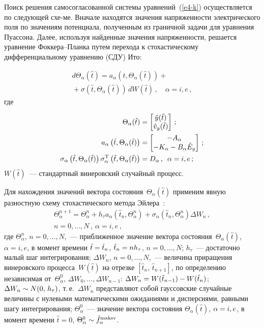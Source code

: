 \begin{multicols}{2}
Поиск решения самосогласованной системы уравнений~(\ref{e4-k}) осуществляется по следующей 
схе-\linebreak ме. Вначале находятся значения напряженности\linebreak
 электрического поля по значениям потенциала, 
полученным из граничной задачи для уравнения Пуассона. Далее, используя найденные значения 
напряженности, решается уравнение Фок\-ке\-ра--План\-ка путем перехода к стохастическому 
дифференциальному уравнению (СДУ) Ито:

\noindent
\begin{multline*}
d\Theta_\alpha(\hat{t}) = a_\alpha \left(\hat{t},\Theta_\alpha(\hat{t})\right)+{}\\
{}+\sigma\left(
\hat{t},\Theta_\alpha(\hat{t})\right)\,dW(\hat{t})\,,\quad \alpha=i,e\,,
\end{multline*}
где 

\noindent
\begin{align*}
\Theta_\alpha(\hat{t})&=\begin{bmatrix}
\hat{y}(\hat{t})\\ \hat{v}_y(\hat{t})
\end{bmatrix}\,;\\
a_\alpha\left(\hat{t},\Theta_\alpha(\hat{t})\right)&=\begin{bmatrix}
-A_\alpha\\ -K_\alpha -B_\alpha \hat{E}_y
\end{bmatrix}\,;\\
\sigma_\alpha\left(\hat{t},\Theta_\alpha(\hat{t})\right)\sigma_\alpha^{\mathrm{T}}\left( 
\hat{t},\Theta_\alpha(\hat{t})\right)&=D_\alpha\,,\enskip \alpha=i,e\,;
\end{align*} 
$W(\hat{t})$~--- стандартный винеровский случайный процесс.
\pagebreak

Для нахождения значений вектора состояния~$\Theta_\alpha(\hat{t})$ применим явную разностную 
схему стохастического метода Эйлера~\cite{16-k}:
\begin{multline*}
\Theta_\alpha^{n+1}=\Theta_\alpha^n +h_\tau a_\alpha \left( \hat{t}_n, \Theta_\alpha^n\right)+\sigma_\alpha 
\left( \hat{t}_n, \Theta_\alpha^n\right)\Delta W_n\,,\\ 
n=0,\ldots , N\,,\ \alpha=i,e\,,
\end{multline*}
где $\Theta_\alpha^n$, $n=0,\ldots , N$,~--- приближенное значение вектора 
состояния~$\Theta_\alpha(\hat{t})$, $\alpha=i,e$, в момент времени $\hat{t}\hm=\hat{t}_n$, 
$\hat{t}_n\hm=n h_\tau$, $n=0,\ldots , N$; $h_\tau$~--- достаточно малый шаг интегрирования; $\Delta 
W_n$, $n=0,\ldots ,N$,~--- величина приращения винеровского процесса~$W(\hat{t})$ на отрезке $\left[ 
\hat{t}_n,\,\hat{t}_{n+1}\right]$, по определению независимая от~$\Theta_\alpha^0$, 
$\Delta W_0,\ldots , 
\Delta W_{n-1}$: $\Delta W_n\hm=W(\hat{t}_{n-1})\hm-W(\hat{t}_n)$; $\Delta W_n\hm\sim N(0,\,h_\tau)$, 
т.\,е.\ $\Delta W_n$ представляют собой гауссовские случайные величины с нулевыми математическими 
ожиданиями и дисперсиями, равными шагу интегрирования; $\Theta_\alpha^0$~--- значение вектора 
состояния $\Theta_\alpha(\hat{t})$, $\alpha\hm=i,e$, в момент времени $\hat{t}=0$, 
$\Theta_\alpha^0\hm\sim \hat{f}_\alpha^{\mathrm{maksv}}$. 


\end{multicols}
